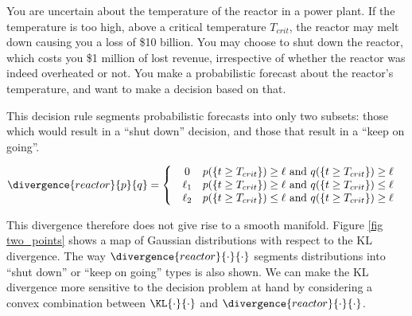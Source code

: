 You are uncertain about the temperature of the reactor in a power plant. If the temperature is too high, above a critical temperature $T_{crit}$, the reactor may melt down causing you a loss of \$10 billion. You may choose to shut down the reactor, which costs you \$1 million of lost revenue, irrespective of whether the reactor was indeed overheated or not. You make a probabilistic forecast about the reactor's temperature, and want to make a decision based on that.

This decision rule segments probabilistic forecasts into only two subsets: those which would result in a ``shut down'' decision, and those that result in a ``keep on going''. 

\begin{equation}
	\divergence{reactor}{p}{q} = \left\{
	\begin{array}{cc} 
	    \begin{array}{cc}
	      0        & p(\{t\geq T_{crit}\}) \geq \ell \mbox{ and } q(\{t\geq T_{crit}\}) \geq \ell\\
	      \ell_1 & p(\{t\geq T_{crit}\})  \geq \ell \mbox{ and } q(\{t\geq T_{crit}\}) \leq \ell\\
	      \ell_2 & p(\{t\geq T_{crit}\})  \leq \ell \mbox{ and } q(\{t\geq T_{crit}\}) \geq \ell
	    \end{array}
	\end{array}
	\right.
\end{equation}

This divergence therefore does not give rise to a smooth manifold. Figure \ref{fig two_points} shows a map of Gaussian distributions with respect to the KL divergence. The way $\divergence{reactor}{\cdot}{\cdot}$ segments distributions into ``shut down'' or ``keep on going'' types is also shown. We can make the KL divergence more sensitive to the decision problem at hand by considering a convex combination between $\KL{\cdot}{\cdot}$ and $\divergence{reactor}{\cdot}{\cdot}$.